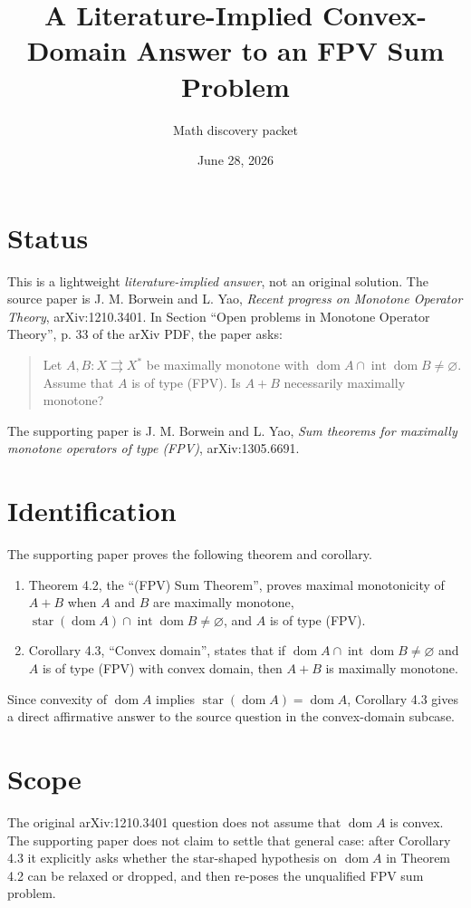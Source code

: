 \documentclass[11pt]{article}
\title{A Literature-Implied Convex-Domain Answer to an FPV Sum Problem}
\author{Math discovery packet}
\date{June 28, 2026}
\newcommand{\domop}{\operatorname{dom}}
\newcommand{\inte}{\operatorname{int}}
\newcommand{\sta}{\operatorname{star}}
\newcommand{\To}{\rightrightarrows}
\begin{document}
\maketitle

\section{Status}

This is a lightweight \emph{literature-implied answer}, not an original
solution.  The source paper is J. M. Borwein and L. Yao,
\emph{Recent progress on Monotone Operator Theory}, arXiv:1210.3401.
In Section ``Open problems in Monotone Operator Theory'', p. 33 of the arXiv
PDF, the paper asks:
\begin{quote}
Let \(A,B:X\To X^*\) be maximally monotone with
\(\domop A\cap\inte\domop B\ne\varnothing\). Assume that \(A\) is of type
(FPV). Is \(A+B\) necessarily maximally monotone?
\end{quote}

The supporting paper is J. M. Borwein and L. Yao,
\emph{Sum theorems for maximally monotone operators of type (FPV)},
arXiv:1305.6691.

\section{Identification}

The supporting paper proves the following theorem and corollary.
\begin{enumerate}[leftmargin=*]
\item Theorem 4.2, the ``(FPV) Sum Theorem'', proves maximal monotonicity of
\(A+B\) when \(A\) and \(B\) are maximally monotone,
\(\sta(\domop A)\cap\inte\domop B\ne\varnothing\), and \(A\) is of type
(FPV).
\item Corollary 4.3, ``Convex domain'', states that if
\(\domop A\cap\inte\domop B\ne\varnothing\) and \(A\) is of type (FPV) with
convex domain, then \(A+B\) is maximally monotone.
\end{enumerate}

Since convexity of \(\domop A\) implies \(\sta(\domop A)=\domop A\), Corollary
4.3 gives a direct affirmative answer to the source question in the
convex-domain subcase.

\section{Scope}

The original arXiv:1210.3401 question does not assume that \(\domop A\) is
convex.  The supporting paper does not claim to settle that general case:
after Corollary 4.3 it explicitly asks whether the star-shaped hypothesis on
\(\domop A\) in Theorem 4.2 can be relaxed or dropped, and then re-poses the
unqualified FPV sum problem.
\end{document}
